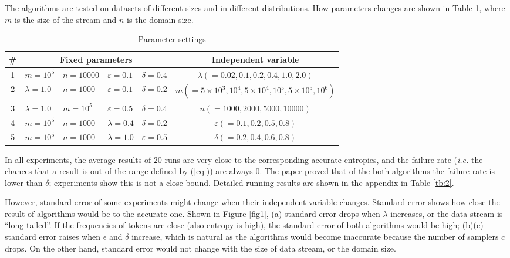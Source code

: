 \documentclass{scrartcl}
\begin{document}
The algorithms are tested on datasets of different sizes and in different distributions. How parameters changes are shown in Table \ref{tb:1}, where $m$ is the size of the stream and $n$ is the domain size.

\begin{table}[htbp]
\centering
\begin{tabularx}{.98\textwidth}{c|llll|c}
\toprule
\# &\multicolumn{4}{c}{Fixed parameters} & Independent variable \\
\midrule
1&$m=10^5$ & $n=10000$ & $\varepsilon=0.1$ & $\delta=0.4$ & $\lambda(=0.02,0.1,0.2,0.4,1.0,2.0)$\\
2&$\lambda=1.0$ & $n=1000$ & $\varepsilon=0.1$ & $\delta=0.2$ & $m(=5\times10^3,10^4,5\times10^4,10^5,5\times10^5,10^6)$\\
3&$\lambda=1.0$ & $m=10^5$ & $\varepsilon=0.5$ & $\delta=0.4$ & $n(=1000,2000,5000,10000)$\\
4&$m=10^5$ & $n=1000$ & $\lambda=0.4$ & $\delta=0.2$ & $\varepsilon(=0.1,0.2,0.5,0.8)$\\
5&$m=10^5$ & $n=1000$ & $\lambda=1.0$ & $\varepsilon=0.5$ & $\delta(=0.2,0.4,0.6,0.8)$\\
\bottomrule
\end{tabularx}
\caption{Parameter settings}
\label{tb:1}
\end{table}

In all experiments, the average results of 20 runs are very close to the corresponding accurate entropies, and the failure rate (\emph{i.e.} the chances that a result is out of the range defined by (\ref{eq})) are always 0. The paper proved that of the both algorithms the failure rate is lower than $\delta$; experiments show this is not a close bound. Detailed running results are shown in the appendix in Table \ref{tb:2}.

However, standard error of some experiments might change when their independent variable changes. Standard error shows how close the result of algorithms would be to the accurate one. Shown in Figure \ref{fig1}, (a) standard error drops when $\lambda$ increases, or the data stream is ``long-tailed''. If the frequencies of tokens are close (also entropy is high), the standard error of both algorithms would be high; (b)(c) standard error raises when $\epsilon$ and $\delta$ increase, which is natural as the algorithms would become inaccurate because the number of samplers $c$drops. On the other hand, standard error would not change with the size of data stream, or the domain size.
\end{document}
